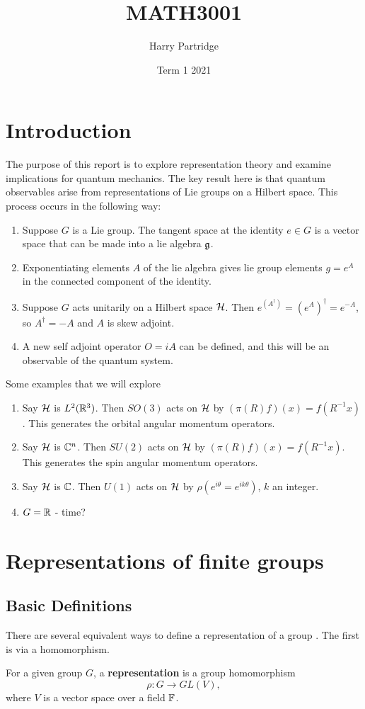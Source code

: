 \documentclass[a4paper]{article}
\title{MATH3001}
\author{Harry Partridge}
\date{Term 1 2021}
\begin{document}
\maketitle

\tableofcontents

\newpage
\section{Introduction}
The purpose of this report is to explore representation theory and examine implications for quantum mechanics. The key result here is that quantum observables arise from representations of Lie groups on a Hilbert space. This process occurs in the following way:
\begin{enumerate}
    \item Suppose $G$ is a Lie group. The tangent space at the identity $e \in G$ is a vector space that can be made into a lie algebra $\mathfrak{g}$. 
    \item Exponentiating elements $A$ of the lie algebra gives lie group elements $g = e^A$ in the connected component of the identity. 
    \item Suppose $G$ acts unitarily on a Hilbert space $\mathcal{H}$. Then $e^{(A^\dagger)} = \left(e^{A}\right)^\dagger = e^{-A}$, so $A^\dagger = -A$ and $A$ is skew adjoint. 
    \item A new self adjoint operator $O = iA$ can be defined, and this will be an observable of the quantum system. 
\end{enumerate}
Some examples that we will explore 
\begin{enumerate}
    \item Say $\mathcal{H}$ is $L^2(\mathbb{R}^3)$. Then $SO(3)$ acts on $\mathcal{H}$ by $(\pi(R)f)(x) = f(R^{-1}x)$. This generates the orbital angular momentum operators.
    \item Say $\mathcal{H}$ is $\mathbb{C}^n$. Then $SU(2)$ acts on $\mathcal{H}$ by $(\pi(R)f)(x) = f(R^{-1}x)$. This generates the spin angular momentum operators.
    \item Say $\mathcal{H}$ is $\mathbb{C}$. Then $U(1)$ acts on $\mathcal{H}$ by $\rho(e^{i\theta} = e^{ik\theta})$, $k$ an integer.
    \item $G = \mathbb{R}$ - time?
\end{enumerate}

\section{Representations of finite groups}

\subsection{Basic Definitions}
There are several equivalent ways to define a representation of a group \cite{dexter}. The first is via a homomorphism. 
\begin{defi}[Representation]
    For a given group $G$, a \textbf{representation} is a group homomorphism $$\rho: G \to GL(V),$$ where $V$ is a vector space over a field $\mathbb{F}$. 
\end{defi}
\end{document}
